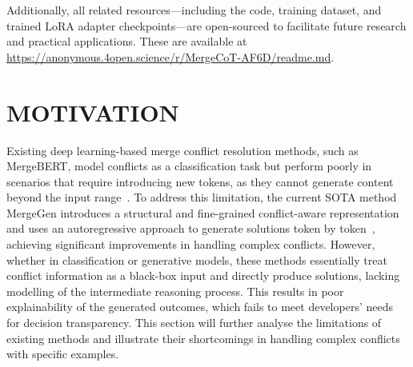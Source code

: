 \documentclass[sigconf,review,anonymous]{acmart}
\begin{document}
Additionally, all related resources—including the code, training dataset, and trained LoRA adapter checkpoints—are open-sourced to facilitate future research and practical applications. 
These are available at \url{https://anonymous.4open.science/r/MergeCoT-AF6D/readme.md}.



\section{MOTIVATION}

Existing deep learning-based merge conflict resolution methods, such as MergeBERT, model conflicts as a classification task but perform poorly in scenarios that require introducing new tokens, as they cannot generate content beyond the input range~\cite{mergebert}. 
To address this limitation, the current SOTA method MergeGen introduces a structural and fine-grained conflict-aware representation and uses an autoregressive approach to generate solutions token by token~\cite{mergegen}, achieving significant improvements in handling complex conflicts. 
However, whether in classification or generative models, these methods essentially treat conflict information as a black-box input and directly produce solutions, lacking modelling of the intermediate reasoning process. This results in poor explainability of the generated outcomes, which fails to meet developers’ needs for decision transparency. This section will further analyse the limitations of existing methods and illustrate their shortcomings in handling complex conflicts with specific examples.
\end{document}

